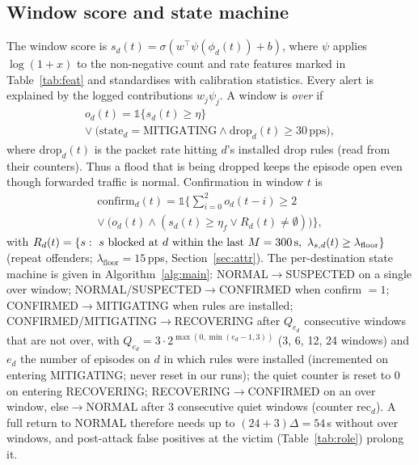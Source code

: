 \documentclass[conference]{IEEEtran}
\begin{document}
\subsection{Window score and state machine}
The window score is $s_d(t)=\sigma(w^\top\psi(\phi_d(t))+b)$, where $\psi$ applies $\log(1+x)$ to the non-negative count and rate features marked in Table~\ref{tab:feat} and standardises with calibration statistics. Every alert is explained by the logged contributions $w_j\psi_j$. A window is \emph{over} if
\begin{multline}
o_d(t)=\mathbb{1}\{s_d(t)\ge\eta\}\\
\lor\ \big(\text{state}_d=\text{MITIGATING}\wedge \mathrm{drop}_d(t)\ge 30\,\text{pps}\big),
\end{multline}
where $\mathrm{drop}_d(t)$ is the packet rate hitting $d$'s installed drop rules (read from their counters). Thus a flood that is being dropped keeps the episode open even though forwarded traffic is normal. Confirmation in window $t$ is
\begin{multline}
\mathrm{confirm}_d(t)=\mathbb{1}\Big\{\textstyle\sum_{i=0}^{2}o_d(t-i)\ge2\\
\lor\ \big(o_d(t)\wedge(s_d(t)\ge\eta_f\lor R_d(t)\neq\emptyset)\big)\Big\},
\end{multline}
with $R_d(t)=\{s:\ s\text{ blocked at }d\text{ within the last }M=300\text{\,s},\ \lambda_{s,d}(t)\ge\lambda_{\text{floor}}\}$ (repeat offenders; $\lambda_{\text{floor}}=15$\,pps, Section~\ref{sec:attr}). The per-destination state machine is given in Algorithm~\ref{alg:main}: NORMAL$\to$SUSPECTED on a single over window; NORMAL/SUSPECTED$\to$CONFIRMED when confirm $=1$; CONFIRMED$\to$MITIGATING when rules are installed; CONFIRMED/MITIGATING$\to$RECOVERING after $Q_{e_d}$ consecutive windows that are not over, with $Q_{e_d}=3\cdot2^{\max(0,\min(e_d-1,3))}$ (3, 6, 12, 24 windows) and $e_d$ the number of episodes on $d$ in which rules were installed (incremented on entering MITIGATING; never reset in our runs); the quiet counter is reset to 0 on entering RECOVERING; RECOVERING$\to$CONFIRMED on an over window, else$\to$NORMAL after 3 consecutive quiet windows (counter rec$_d$). A full return to NORMAL therefore needs up to $(24+3)\Delta=54$\,s without over windows, and post-attack false positives at the victim (Table~\ref{tab:role}) prolong it.
\end{document}
